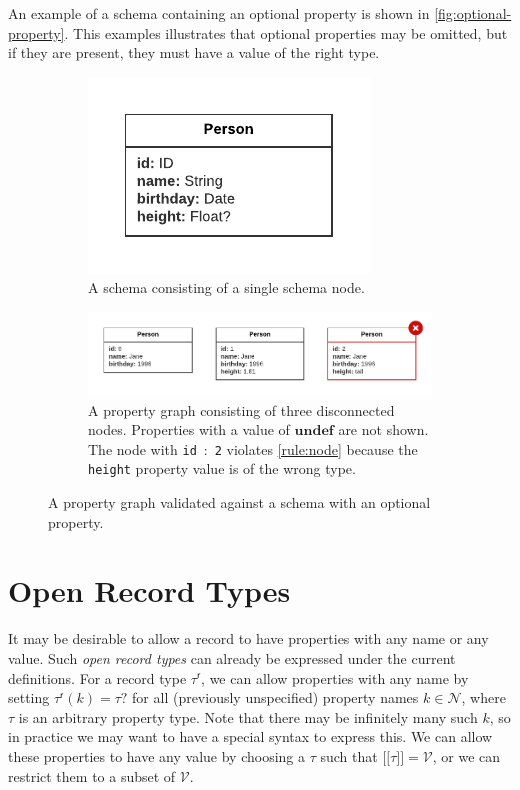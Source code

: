 \documentclass{report}
\theoremstyle{definition}
\newcommand{\ptype}{\tau}
\newcommand{\rtype}{\tau^\mathsf{r}}
\newcommand{\lsem}{\ensuremath{[\![}}
\newcommand{\rsem}{\ensuremath{]\!]}}
\newcommand{\sem}[1]{\ensuremath{\lsem #1 \rsem}}
\newcommand{\undefined}{\mathbf{undef}}
\begin{document}
An example of a schema containing an optional property is shown in \autoref{fig:optional-property}. This examples illustrates that optional properties may be omitted, but if they are present, they must have a value of the right type.

\begin{figure}[t]
  \centering
  \begin{subfigure}[t]{0.8\textwidth}
    \centering
    \includegraphics[scale=0.75]{figures/pg-schema-optional-prop.pdf}
    \caption{A schema consisting of a single schema node.}
  \end{subfigure}
  \hfill
  \begin{subfigure}[t]{0.8\textwidth}
    \centering
    \includegraphics[scale=0.75]{figures/conformance-optional-prop.pdf}
    \caption{A property graph consisting of three disconnected nodes. Properties with a value of $\undefined$ are not shown. The node with \texttt{id}~:~\texttt{2} violates \autoref{rule:node} because the \texttt{height} property value is of the wrong type.}
  \end{subfigure}
  \caption[A property graph validated against a schema with an optional property]{A property graph validated against a schema with an optional property.}
  \label{fig:optional-property}
\end{figure}

\section{Open Record Types}

It may be desirable to allow a record to have properties with any name or any value. Such \emph{open record types} can already be expressed under the current definitions. For a record type $\rtype$, we can allow properties with any name by setting $\rtype(k) = \ptype?$ for all (previously unspecified) property names $k \in \mathcal{N}$, where $\ptype$ is an arbitrary property type. Note that there may be infinitely many such $k$, so in practice we may want to have a special syntax to express this. We can allow these properties to have any value by choosing a $\ptype$ such that $\sem{\ptype} = \mathcal{V}$, or we can restrict them to a subset of $\mathcal{V}$.
\end{document}
